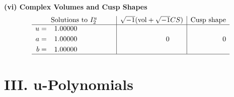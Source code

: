 \documentclass[1p]{elsarticle_modified}
\theoremstyle{definition}
\newcommand{\I}{\sqrt{-1}}
\begin{document}
\newpage\flushleft \textbf{(vi) Complex Volumes and Cusp Shapes}
$$\begin{array}{c|c|c}  
\text{Solutions to }I^u_{2}& \I (\text{vol} + \sqrt{-1}CS) & \text{Cusp shape}\\
 \hline 
\begin{aligned}
u &= \phantom{-}1.00000\phantom{ +0.000000I} \\
a &= \phantom{-}1.00000\phantom{ +0.000000I} \\
b &= \phantom{-}1.00000\phantom{ +0.000000I}\end{aligned}
 & \phantom{-0.000000 } 0 & \phantom{-0.000000 } 0\\
 \hline 
 \end{array}$$\newpage
\newpage\renewcommand{\arraystretch}{1}
\centering \section*{ III. u-Polynomials}
\end{document}
